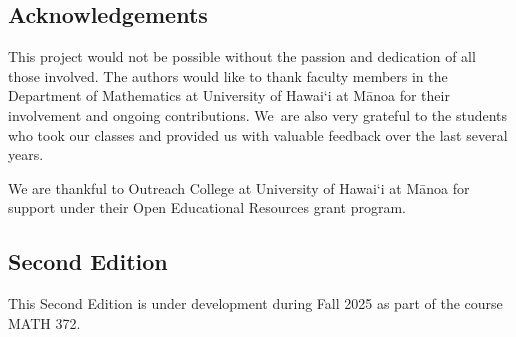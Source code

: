 
\subsection*{Acknowledgements}

This project would not be possible without the passion and dedication of all those involved. %
The authors would like to thank faculty members in the Department of Mathematics at  University of Hawai\textquoteleft i at M\=anoa for their involvement and ongoing contributions. We~are also very grateful to the students who took our classes and provided us with valuable feedback over the last several years.

We are thankful to Outreach College at University of Hawai\textquoteleft i at M\=anoa for support under their Open Educational Resources grant program.

\subsection*{Second Edition}
This Second Edition is under development during Fall 2025 as part of the course MATH 372.

